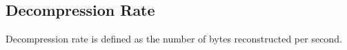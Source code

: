 \subsection{Decompression Rate}

Decompression rate is defined as the number of bytes reconstructed per second.

